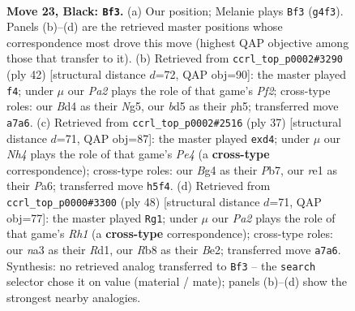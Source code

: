 \documentclass[11pt]{article}
\begin{document}
\clearpage

\begin{figure}[p]\centering
\begin{subfigure}{0.46\textwidth}\centering
\resizebox{\linewidth}{!}{%
\newchessgame
\chessboard[
  setfen={1r3r2/pp4k1/6pp/2pB3n/3bpPbP/N5P1/PP1P4/1RB1RK2 b - f3 0 23},
  showmover=false,
  pgfstyle=straightmove, color=movearrow, markmove={g4-f3}
]}
\caption{}
\end{subfigure}\hfill
\begin{subfigure}{0.46\textwidth}\centering
\resizebox{\linewidth}{!}{%
\newchessgame
\chessboard[
  setfen={r1k1bb1r/2p2pp1/1p4n1/3NP1Np/p1P3P1/6KP/1BP2P2/R4R2 w - - 0 22},
  showmover=false,
  pgfstyle=straightmove, color=movearrow, markmove={f2-f4}
]}
\caption{}
\end{subfigure}
\\[4pt]
\begin{subfigure}{0.46\textwidth}\centering
\resizebox{\linewidth}{!}{%
\newchessgame
\chessboard[
  setfen={2kr3r/1p3pp1/p1n1b3/2B1p2p/3P2P1/2P4P/P4PB1/R2R2K1 b - - 0 19},
  showmover=false,
  pgfstyle=straightmove, color=movearrow, markmove={e5-d4}
]}
\caption{}
\end{subfigure}\hfill
\begin{subfigure}{0.46\textwidth}\centering
\resizebox{\linewidth}{!}{%
\newchessgame
\chessboard[
  setfen={r1b2rk1/1p2b3/p5p1/n1p1p2p/5PPP/2P5/P3BB1N/3RK2R w K - 0 25},
  showmover=false,
  pgfstyle=straightmove, color=movearrow, markmove={h1-g1}
]}
\caption{}
\end{subfigure}
\caption{\textbf{Move 23, Black: \texttt{Bf3}.} (a) Our position; Melanie plays \texttt{Bf3} (\texttt{g4f3}). Panels (b)--(d) are the retrieved master positions whose correspondence most drove this move (highest QAP objective among those that transfer to it). (b) Retrieved from \texttt{ccrl\_top\_p0002\#3290} (ply 42) [structural distance $d$=72, QAP obj=90]: the master played \texttt{f4}; under $\mu$ our \emph{Pa2} plays the role of that game's \emph{Pf2}; cross-type roles: our \emph{B}d4 as their \emph{N}g5, our \emph{b}d5 as their \emph{p}h5; transferred move \texttt{a7a6}. (c) Retrieved from \texttt{ccrl\_top\_p0002\#2516} (ply 37) [structural distance $d$=71, QAP obj=87]: the master played \texttt{exd4}; under $\mu$ our \emph{Nh4} plays the role of that game's \emph{Pe4} (a \textbf{cross-type} correspondence); cross-type roles: our \emph{B}g4 as their \emph{P}b7, our \emph{r}e1 as their \emph{P}a6; transferred move \texttt{h5f4}. (d) Retrieved from \texttt{ccrl\_top\_p0000\#3300} (ply 48) [structural distance $d$=71, QAP obj=77]: the master played \texttt{Rg1}; under $\mu$ our \emph{Pa2} plays the role of that game's \emph{Rh1} (a \textbf{cross-type} correspondence); cross-type roles: our \emph{n}a3 as their \emph{R}d1, our \emph{R}b8 as their \emph{B}e2; transferred move \texttt{a7a6}. Synthesis: no retrieved analog transferred to \texttt{Bf3} -- the \texttt{search} selector chose it on value (material / mate); panels (b)--(d) show the strongest nearby analogies.}
\label{fig:thought-m45}
\end{figure}
\end{document}
